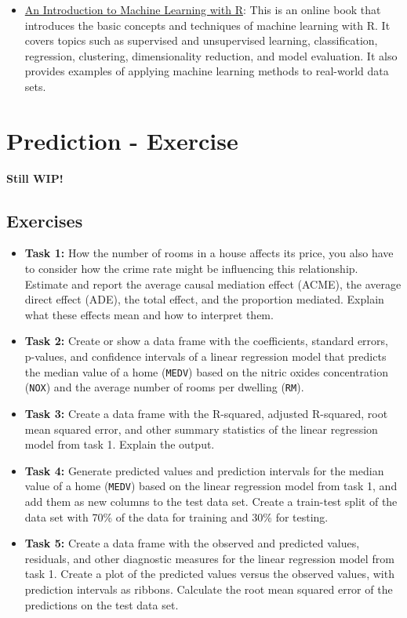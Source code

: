 \documentclass[
]{book}
\providecommand{\tightlist}{%
  \setlength{\itemsep}{0pt}\setlength{\parskip}{0pt}}
\begin{document}
\begin{itemize}
\tightlist
\item
  \href{https://lgatto.github.io/IntroMachineLearningWithR/}{An Introduction to Machine Learning with R}: This is an online book that introduces the basic concepts and techniques of machine learning with R. It covers topics such as supervised and unsupervised learning, classification, regression, clustering, dimensionality reduction, and model evaluation. It also provides examples of applying machine learning methods to real-world data sets.
\end{itemize}

\hypertarget{pm-a}{%
\chapter{Prediction - Exercise}\label{pm-a}}

\textbf{Still WIP!}

\hypertarget{exercises}{%
\section{Exercises}\label{exercises}}

\begin{itemize}
\item
  \textbf{Task 1:} How the number of rooms in a house affects its price, you also have to consider how the crime rate might be influencing this relationship. Estimate and report the average causal mediation effect (ACME), the average direct effect (ADE), the total effect, and the proportion mediated. Explain what these effects mean and how to interpret them.
\item
  \textbf{Task 2:} Create or show a data frame with the coefficients, standard errors, p-values, and confidence intervals of a linear regression model that predicts the median value of a home (\texttt{MEDV}) based on the nitric oxides concentration (\texttt{NOX}) and the average number of rooms per dwelling (\texttt{RM}).
\item
  \textbf{Task 3:} Create a data frame with the R-squared, adjusted R-squared, root mean squared error, and other summary statistics of the linear regression model from task 1. Explain the output.
\item
  \textbf{Task 4:} Generate predicted values and prediction intervals for the median value of a home (\texttt{MEDV}) based on the linear regression model from task 1, and add them as new columns to the test data set. Create a train-test split of the data set with 70\% of the data for training and 30\% for testing.
\item
  \textbf{Task 5:} Create a data frame with the observed and predicted values, residuals, and other diagnostic measures for the linear regression model from task 1. Create a plot of the predicted values versus the observed values, with prediction intervals as ribbons. Calculate the root mean squared error of the predictions on the test data set.
\end{itemize}
\end{document}

